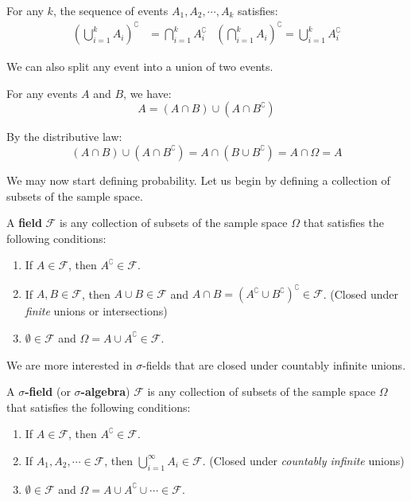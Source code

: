 \documentclass{huhtakm-template-book-v2}
\begin{document}
    \begin{thm}
        For any $k$, the sequence of events $A_{1},A_{2},\cdots,A_{k}$ satisfies:
        \begin{align*}
            \left(\bigcup_{i = 1}^{k}A_{i}\right)^{\complement} &= \bigcap_{i = 1}^{k}A_{i}^{\complement} & \left(\bigcap_{i = 1}^{k}A_{i}\right)^{\complement} = \bigcup_{i = 1}^{k}A_{i}^{\complement}
        \end{align*}
    \end{thm}
    We can also split any event into a union of two events.
    \begin{lem}
        For any events $A$ and $B$, we have:
        \begin{equation*}
            A = (A\cap B)\cup(A\cap B^{\complement})
        \end{equation*}
    \end{lem}
    \begin{proofing}
        By the distributive law:
        \begin{equation*}
            (A\cap B)\cup(A\cap B^{\complement}) = A\cap(B\cup B^{\complement}) = A\cap\Omega = A
        \end{equation*}
    \end{proofing}
    We may now start defining probability. Let us begin by defining a collection of subsets of the sample space.
    \begin{defn}
        A \textbf{field} $\mathcal{F}$ is any collection of subsets of the sample space $\Omega$ that satisfies the following conditions:
        \begin{enumerate}
            \item If $A \in \mathcal{F}$, then $A^{\complement} \in \mathcal{F}$.
            \item If $A,B \in \mathcal{F}$, then $A\cup B \in \mathcal{F}$ and $A\cap B = (A^{\complement}\cup B^{\complement})^{\complement} \in \mathcal{F}$. (Closed under \textit{finite} unions or intersections)
            \item $\emptyset \in \mathcal{F}$ and $\Omega = A\cup A^{\complement} \in \mathcal{F}$.
        \end{enumerate}
    \end{defn}
    We are more interested in $\sigma$-fields that are closed under countably infinite unions.
    \begin{defn}
        A \textbf{$\sigma$-field} (or \textbf{$\sigma$-algebra}) $\mathcal{F}$ is any collection of subsets of the sample space $\Omega$ that satisfies the following conditions:
        \begin{enumerate}
            \item If $A \in \mathcal{F}$, then $A^{\complement} \in \mathcal{F}$.
            \item If $A_{1},A_{2},\cdots \in \mathcal{F}$, then $\bigcup_{i = 1}^{\infty}A_{i} \in \mathcal{F}$. (Closed under \textit{countably infinite} unions)
            \item $\emptyset \in \mathcal{F}$ and $\Omega = A\cup A^{\complement}\cup\cdots \in \mathcal{F}$.
        \end{enumerate}
    \end{defn}
\end{document}

